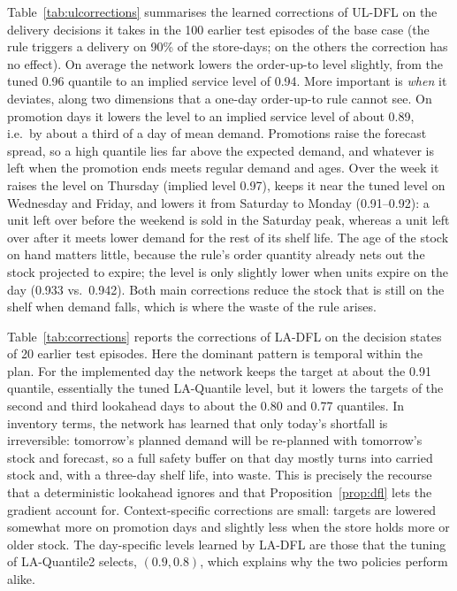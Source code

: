 Table~\ref{tab:ulcorrections} summarises the learned corrections of UL-DFL on the delivery decisions it takes in the 100 earlier test episodes of the base case (the rule triggers a delivery on 90\% of the store-days; on the others the correction has no effect). On average the network lowers the order-up-to level slightly, from the tuned 0.96 quantile to an implied service level of 0.94. More important is \emph{when} it deviates, along two dimensions that a one-day order-up-to rule cannot see. On promotion days it lowers the level to an implied service level of about 0.89, i.e.\ by about a third of a day of mean demand. Promotions raise the forecast spread, so a high quantile lies far above the expected demand, and whatever is left when the promotion ends meets regular demand and ages. Over the week it raises the level on Thursday (implied level 0.97), keeps it near the tuned level on Wednesday and Friday, and lowers it from Saturday to Monday (0.91--0.92): a unit left over before the weekend is sold in the Saturday peak, whereas a unit left over after it meets lower demand for the rest of its shelf life. The age of the stock on hand matters little, because the rule's order quantity already nets out the stock projected to expire; the level is only slightly lower when units expire on the day (0.933 vs.\ 0.942). Both main corrections reduce the stock that is still on the shelf when demand falls, which is where the waste of the rule arises.

\begin{table}[H]
\centering\footnotesize
\caption{Learned corrections of UL-DFL on the delivery decisions of 100 earlier test episodes (base case): mean correction $\delta_\theta$ of the order-up-to level in units of the forecast scale, implied service level $\Phi(z_{0.96}+\delta_\theta)$, and change of the order-up-to level in days of mean store demand. Stock is measured in days of mean store demand.}\label{tab:ulcorrections}
\resizebox{0.85\textwidth}{!}{}
\end{table}

Table~\ref{tab:corrections} reports the corrections of LA-DFL on the decision states of 20 earlier test episodes. Here the dominant pattern is temporal within the plan. For the implemented day the network keeps the target at about the 0.91 quantile, essentially the tuned LA-Quantile level, but it lowers the targets of the second and third lookahead days to about the 0.80 and 0.77 quantiles. In inventory terms, the network has learned that only today's shortfall is irreversible: tomorrow's planned demand will be re-planned with tomorrow's stock and forecast, so a full safety buffer on that day mostly turns into carried stock and, with a three-day shelf life, into waste. This is precisely the recourse that a deterministic lookahead ignores and that Proposition~\ref{prop:dfl} lets the gradient account for. Context-specific corrections are small: targets are lowered somewhat more on promotion days and slightly less when the store holds more or older stock. The day-specific levels learned by LA-DFL are those that the tuning of LA-Quantile2 selects, $(0.9,0.8)$, which explains why the two policies perform alike.

